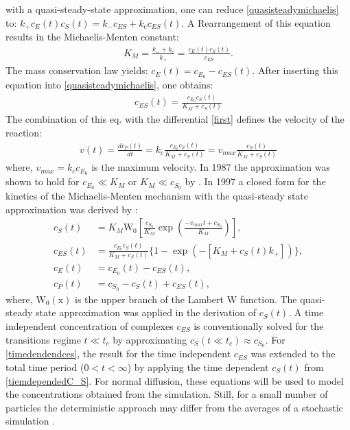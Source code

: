 \documentclass[
  a4paper,BCOR10mm,twoside,
  headsepline,footsepline,%
  fleqn,openbib
]{scrbook}
\begin{document}
with a quasi-steady-state approximation, one can reduce \cref{quasisteadymichaelis} to: $ k_{\mathrm{+}}c_E(t) c_S(t)=k_{\mathrm{-}}c_{ES}+k_{\mathrm{c}}c_{ES}(t)$. A Rearrangement of this equation results in the Michaelis-Menten constant:
\begin{align}
 K_M=\frac{k_{\mathrm{-}}+k_{\mathrm{c}}}{k_{\mathrm{+}}}=\frac{c_E(t) c_S(t)}{c_{ES}}. 
\end{align}
The mass conservation law yields: $c_E(t)=c_{E_0} -c_{ES}(t)$. After inserting this equation into \cref{quasisteadymichaelis}, one obtains:
\begin{align}
 c_{ES}(t)=\frac{c_{E_0} c_S(t)}{K_M+c_S(t)}
\end{align}
The combination of this eq. with the differential \cref{first} defines the velocity of the reaction:
\begin{align}
 v(t)= \frac{dc_P(t)}{dt}= k_{\mathrm{c}} \frac{c_{E_0} c_S(t)}{K_M+c_S(t)} = v_{max} \frac{c_S(t)}{K_M+c_S(t)}  
\end{align}
where, $v_{max}=k_c c_{E_0}$ is the maximum velocity. In 1987 the approximation was shown to hold for $c_{E_0}\ll K_M \text{ or } K_M \ll c_{S_0}$ by \citet{Palsson1987}. In 1997 a closed form for the kinetics of the Michaelis-Menten mechanism with the quasi-steady state approximation was derived by  \citet{Schnell1997}:
\begin{align}
 c_S(t)&=K_M \mathrm{W_0}\left[\frac{c_{S_0}}{K_M} \exp \left( \frac{-v_{max} t + c_{S_0}}{K_M}\right)\right],  \label{tiemdependedC_S} \\
 c_{ES}(t)&= \frac{c_{E_0} c_S(t)}{K_M+c_S(t)} \lbrace 1- \exp \left( - \left[ K_M + c_S(t) k_{+} \right] \right) \rbrace, \label{timedendendces}\\ 
 c_{E}(t)&=c_{E_0}(t)-c_{ES}(t), \label{timedendendce}\\
 c_{P}(t)&=c_{S_0}-c_S(t)+c_{ES}(t), \label{timedendendcp}
\end{align}
where,  $\mathrm{W_0(x)}$ is the upper branch of the Lambert W function. The quasi-steady state approximation was applied in the derivation of $c_S(t)$. A time independent   concentration of complexes $c_{ES}$ is conventionally solved for the transitions regime $t \ll t_c$ by approximating $c_S(t \ll t_c) \approx c_{S_0}$. For \cref{timedendendces}, the result for the time independent $c_{ES}$ was extended to the total time period ($0<t<\infty$) by applying the time dependent $c_S(t)$ from \cref{tiemdependedC_S}. For normal diffusion, these equations will be used to model the concentrations obtained from the simulation.  Still, for a small number of particles the deterministic approach may differ from the averages of a stochastic simulation \cite{Turner2004}.\par
\end{document}
